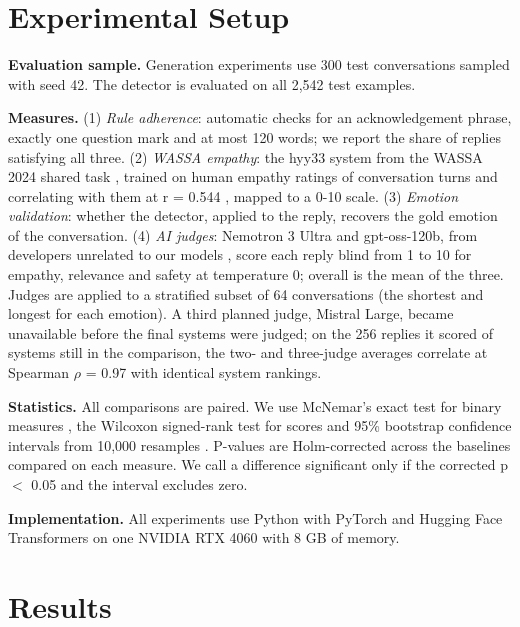 \documentclass[conference,a4paper]{IEEEtran}
\begin{document}
\section{Experimental Setup}
\textbf{Evaluation sample.} Generation experiments use 300 test conversations sampled with seed 42. The detector is evaluated on all 2,542 test examples.

\textbf{Measures.} (1) \emph{Rule adherence}: automatic checks for an acknowledgement phrase, exactly one question mark and at most 120 words; we report the share of replies satisfying all three. (2) \emph{WASSA empathy}: the hyy33 system from the WASSA 2024 shared task \cite{b26}, trained on human empathy ratings of conversation turns and correlating with them at r = 0.544 \cite{b17}, mapped to a 0-10 scale. (3) \emph{Emotion validation}: whether the detector, applied to the reply, recovers the gold emotion of the conversation. (4) \emph{AI judges}: Nemotron 3 Ultra and gpt-oss-120b, from developers unrelated to our models \cite{b15}, score each reply blind from 1 to 10 for empathy, relevance and safety at temperature 0; overall is the mean of the three. Judges are applied to a stratified subset of 64 conversations (the shortest and longest for each emotion). A third planned judge, Mistral Large, became unavailable before the final systems were judged; on the 256 replies it scored of systems still in the comparison, the two- and three-judge averages correlate at Spearman $\rho$ = 0.97 with identical system rankings.

\textbf{Statistics.} All comparisons are paired. We use McNemar's exact test for binary measures \cite{b27}, the Wilcoxon signed-rank test for scores \cite{b28} and 95\% bootstrap confidence intervals from 10,000 resamples \cite{b29}. P-values are Holm-corrected \cite{b30} across the baselines compared on each measure. We call a difference significant only if the corrected p $<$ 0.05 and the interval excludes zero.

\textbf{Implementation.} All experiments use Python with PyTorch \cite{b31} and Hugging Face Transformers \cite{b32} on one NVIDIA RTX 4060 with 8 GB of memory.


\section{Results}
\end{document}
